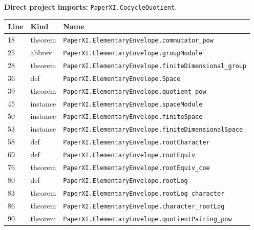 \documentclass[10pt,oneside]{book}
\begin{document}

\textbf{Direct project imports:} \nolinkurl{PaperXI.CocycleQuotient}.

\begin{longtable}{@{}p{}p{}p{}@{}}\toprule Line&Kind&Name\\\midrule\endhead

18&theorem&\nolinkurl{PaperXI.ElementaryEnvelope.commutator_pow}\\

25&abbrev&\nolinkurl{PaperXI.ElementaryEnvelope.groupModule}\\

28&theorem&\nolinkurl{PaperXI.ElementaryEnvelope.finiteDimensional_group}\\

36&def&\nolinkurl{PaperXI.ElementaryEnvelope.Space}\\

39&theorem&\nolinkurl{PaperXI.ElementaryEnvelope.quotient_pow}\\

45&instance&\nolinkurl{PaperXI.ElementaryEnvelope.spaceModule}\\

50&instance&\nolinkurl{PaperXI.ElementaryEnvelope.finiteSpace}\\

53&instance&\nolinkurl{PaperXI.ElementaryEnvelope.finiteDimensionalSpace}\\

58&def&\nolinkurl{PaperXI.ElementaryEnvelope.rootCharacter}\\

69&def&\nolinkurl{PaperXI.ElementaryEnvelope.rootEquiv}\\

76&theorem&\nolinkurl{PaperXI.ElementaryEnvelope.rootEquiv_coe}\\

80&def&\nolinkurl{PaperXI.ElementaryEnvelope.rootLog}\\

83&theorem&\nolinkurl{PaperXI.ElementaryEnvelope.rootLog_character}\\

86&theorem&\nolinkurl{PaperXI.ElementaryEnvelope.character_rootLog}\\

90&theorem&\nolinkurl{PaperXI.ElementaryEnvelope.quotientPairing_pow}\\


\end{longtable}
\end{document}
